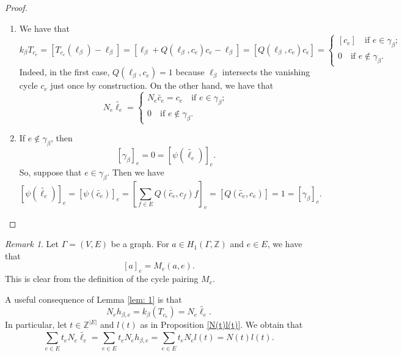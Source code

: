 \documentclass[a4paper,12 pt,titlepage,twoside]{book}
\newcommand{\numberset}{\mathbb}
\newcommand{\Z}{\numberset{Z}}
\theoremstyle{plain}
\theoremstyle{theorem}
\theoremstyle{definition}
\theoremstyle{remark}
\newtheorem{oss}[thm]{Remark}
\begin{document}
	\begin{proof}
		\begin{enumerate}[label=(\arabic*)] 	
			\item We have that $$k_\beta T_{c_e} = \left[T_{c_e}(\ell_\beta) - \ell_\beta\right] = [\ell_\beta + Q(\ell_\beta, c_e)c_e - \ell_\beta] = [Q(\ell_\beta,c_e) c_e] = \begin{cases}
			[c_e] \quad \text{if } e \in \gamma_\beta;\\ 0 \quad \text{if } e \notin \gamma_\beta.
			\end{cases}$$ Indeed, in the first case, $Q(\ell_\beta,c_e)=1$ because $\ell_\beta$ intersects the vanishing cycle $c_e$ just once by construction. On the other hand, we have that $$N_e\widetilde{\ell_e} = \begin{cases}
			N_e\widetilde{c_e} = c_e \quad \text{if } e \in \gamma_\beta; \\ 0 \quad \text{if } e \notin \gamma_\beta.
			\end{cases}$$
			\item If $e \notin \gamma_\beta$, then $$[\gamma_\beta]_e = 0 = [\psi(\widetilde{\ell_e})]_e.$$ So, suppose that $e \in \gamma_\beta$. Then we have 
			$$[\psi(\widetilde{\ell_e})]_e = [\psi(\widetilde{c_e})]_e = [\sum_{f \in E} Q(\widetilde{c_e},c_f) f]_e = [Q(\widetilde{c_e},c_e)] = 1 = [\gamma_\beta]_e.$$
		\end{enumerate}
	\end{proof}
	\begin{oss}
		Let $\Gamma=(V,E)$ be a graph. For $a \in H_1(\Gamma, \Z)$ and $e \in E$, we have that $$[a]_e = M_e(a,e).$$ 
		This is clear from the definition of the cycle pairing $M_e$.
	\end{oss}
	A useful consequence of Lemma \ref{lem: 1} is that \begin{equation}\label{eq: Ne hbetae = Ne ell e} N_e h_{\beta,e} = k_\beta(T_{c_e}) = N_e \widetilde{\ell_e}.\end{equation} In particular, let $t \in \Z^{|E|}$ and $l(t)$ as in Proposition \ref{N(t)l(t)}. We obtain that $$\sum_{e \in E} t_e N_e \widetilde{\ell_e} = \sum_{e \in E} t_e N_e h_{\beta,e} = \sum_{e \in E} t_e N_e l(t) = N(t)l(t).$$
	
\end{document}
